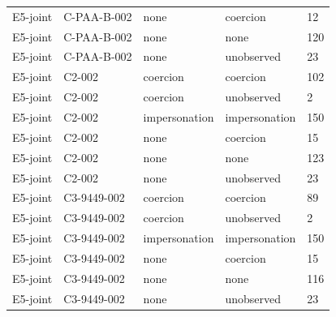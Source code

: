 \begin{tabular}{lllll}
E5-joint & C-PAA-B-002 & none & coercion & 12 \\
E5-joint & C-PAA-B-002 & none & none & 120 \\
E5-joint & C-PAA-B-002 & none & unobserved & 23 \\
E5-joint & C2-002 & coercion & coercion & 102 \\
E5-joint & C2-002 & coercion & unobserved & 2 \\
E5-joint & C2-002 & impersonation & impersonation & 150 \\
E5-joint & C2-002 & none & coercion & 15 \\
E5-joint & C2-002 & none & none & 123 \\
E5-joint & C2-002 & none & unobserved & 23 \\
E5-joint & C3-9449-002 & coercion & coercion & 89 \\
E5-joint & C3-9449-002 & coercion & unobserved & 2 \\
E5-joint & C3-9449-002 & impersonation & impersonation & 150 \\
E5-joint & C3-9449-002 & none & coercion & 15 \\
E5-joint & C3-9449-002 & none & none & 116 \\
E5-joint & C3-9449-002 & none & unobserved & 23 \\
\hline
\end{tabular}
